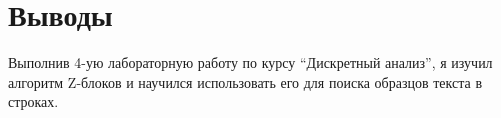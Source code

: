 \section{Выводы}
Выполнив 4-ую лабораторную работу по курсу \enquote{Дискретный анализ}, я изучил алгоритм Z-блоков и научился использовать его для поиска образцов текста в строках.
\pagebreak

